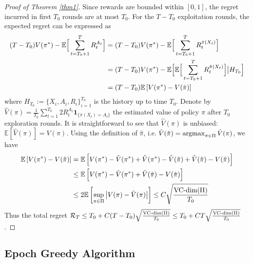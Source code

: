 \documentclass[11pt]{article}
\begin{document}
\vspace{2ex}
\begin{proof}[Proof of Theorem \ref{thm1}]
	Since rewards are bounded within $[0, 1]$, the regret incurred in first $T_0$ rounds are at most $T_0$. For the $T - T_0$ exploitation rounds, the expected regret can be expressed as
	\begin{align*}
	 (T-T_0) V(\pi^*)  -  \mathbb{E} \Big[\sum_{t=T_0+1}^{T} R_t^{A_t}\Big] 
	 &= (T-T_0) V(\pi^*)  - \mathbb{E} \Big[ \sum_{t=T_0+1}^{T} R_t^{\hat \pi(X_t)} \Big]\\
	 &= (T-T_0) V(\pi^*)  - \mathbb{E} \Big[ \mathbb{E} \Big[ \sum_{t=T_0+1}^{T} R_t^{\hat \pi(X_t)} \Big] \big | H_{T_0 } \Big] \\
	 & = (T-T_0) \mathbb{E}\left[  V(\pi^*) - V(\hat \pi) \right]
	\end{align*}
	where $H_{T_0} := \{X_i, A_i, R_i\}_{i=1}^{T_0}$ is the history up to time $T_0$.  Denote by $\hat V(\pi) = \frac{1}{T_0} \sum_{t=1}^{T_0} 2 R_t^{A_t} \mathbf{1}_{\{\pi(X_t) = A_t\}}$ the estimated value of policy $\pi$ after $T_0$ exploration rounds.  It is straightforward to see that $\hat V(\pi)$ is unbiased: $\mathbb{E}[\hat V(\pi)] = V(\pi)$. Using the definition of $\hat \pi$, i.e. $\hat V(\hat \pi) = \operatorname*{argmax}_{\pi \in \Pi} \hat V(\pi)$, we have
	\begin{align}
	\mathbb{E}\left[  V(\pi^*) - V(\hat \pi) \right] & = \mathbb{E}\left[  V(\pi^*) - \hat V(\pi^*) + \hat V(\pi^*) - \hat V(\hat \pi) + \hat V(\hat \pi) - V(\hat \pi) \right] \label{e1}\\
	& \leq \mathbb{E}\left[  V(\pi^*) - \hat V(\pi^*)  + \hat V(\hat \pi) - V(\hat \pi) \right]\\
	& \leq 2 \mathbb{E}\left[ \sup_{\pi \in \Pi}  \big| V(\pi) - \hat V(\pi) \big| \right] 
	 \leq C \sqrt{\frac{\text{VC-dim}(\Pi)}{T_0}} \label{e2}
	\end{align}
	Thus the total regret $	\mathcal{R}_T \leq T_0 + C (T-T_0) \sqrt{\frac{\text{VC-dim}(\Pi)}{T_0}} \leq T_0 + CT \sqrt{\frac{\text{VC-dim}(\Pi)}{T_0}}$. 

	
\end{proof}


\subsection{Epoch Greedy Algorithm}
\end{document}
